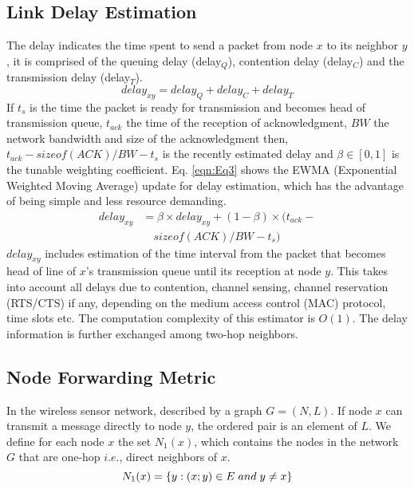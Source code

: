 \documentclass[fleqn,twoside]{article}
\begin{document}
\subsection{Link Delay Estimation}
The delay indicates the time spent to send a packet from node $x$ to its neighbor $y$, it is comprised of the queuing delay (delay$_Q$), 
contention delay (delay$_C$) and the transmission delay (delay$_T$).
\begin{equation}
delay_{xy} = delay_{Q} + delay_{C} + delay_{T}
\label{eqn:Eq2}
\end{equation}
If $t_{s}$ is the time the packet is ready for transmission and becomes head of transmission queue, $t_{ack}$ the time of the reception of acknowledgment, $BW$ the network bandwidth and size of the acknowledgment then, $t_{ack} - sizeof(ACK)/BW - t_{s}$ is the recently
estimated delay and $\beta \in [0,1]$ is the tunable weighting coefficient. Eq. \ref{eqn:Eq3} shows the EWMA (Exponential Weighted 
Moving Average) update for delay 
estimation, which has the advantage of being simple and less resource demanding. 
\begin{equation}
\begin{split}
delay_{xy}& = \beta \times delay_{xy} + (1-\beta) \times(t_{ack} - \\
          & \quad sizeof(ACK)/BW - t_{s})
\label{eqn:Eq3}
\end{split}
\end{equation}
$delay_{xy}$ includes estimation of the time interval from the packet that becomes head of line of $x$'s transmission queue until 
its reception at node $y$. This takes into account all delays due
to contention, channel sensing, channel reservation (RTS/CTS) if any, depending on the medium access control (MAC) protocol, time slots etc. The computation complexity of this estimator is $O(1)$. The delay information is further exchanged among two-hop neighbors.

\subsection{Node Forwarding Metric}
In the wireless sensor network, described by a graph $G=(N,L)$. If node $x$ 
can transmit a message directly to node $y$, the ordered pair is an element of $L$. We define for each node $x$ the set $N_1(x)$, which contains the nodes
in the network $G$ that are one-hop $i.e.$, direct neighbors of $x$.
\begin{equation}
N_1(x) = \{y:(x;y) \in E \hspace{0.1cm} and \hspace{0.1cm} y \neq x\}
\label{eqn:Eq4}
\end{equation}
\end{document}
